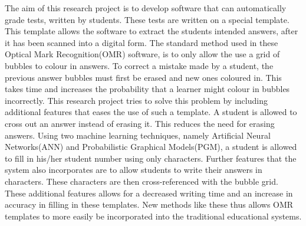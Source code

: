 


\begin{abstracts}        %
The aim of this research project is to develop software that can automatically grade tests, written by students. These tests are written on a special template. This template allows the software to extract the students intended answers, after it has been scanned into a digital form. The standard method used in these Optical Mark Recognition(OMR) software, is to only allow the use a grid of bubbles to colour in answers. To correct a mistake made by a student, the previous answer bubbles must first be erased and new ones coloured in. This takes time and increases the probability that a learner might colour in bubbles incorrectly. This research project tries to solve this problem by including additional features that eases the use of such a template. A student is allowed to cross out an answer instead of erasing it. This reduces the need for erasing answers. Using two machine learning techniques, namely Artificial Neural Networks(ANN) and Probabilistic Graphical Models(PGM), a student is allowed to fill in his/her student number using only characters. Further features that the system also incorporates are to allow students to write their answers in characters. These characters are then cross-referenced with the bubble grid. These additional features allows for a decreased writing time and an increase in accuracy in filling in these templates. New methods like these thus allows OMR templates to more easily be incorporated into the traditional educational systems.
\end{abstracts}

